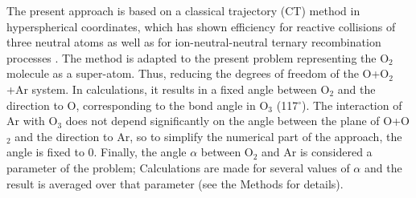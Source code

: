 \documentclass[aps,prl,twocolumn,showpacs,preprintnumbers,amsmath,amssymb,floatfix]{revtex4-2}
\begin{document}
The present approach is based on a classical trajectory (CT) method in hyperspherical coordinates, which has shown efficiency for reactive collisions of three neutral atoms \cite{Perez-Rios2014,Greene2017,Mirahmadi2021,Mirahmadi2021a} as well as for ion-neutral-neutral ternary recombination processes \cite{Perez-Rios2015,Krukow2016,JPR2018}. The method is adapted to the present problem representing the O$_2$ molecule as a super-atom. Thus, reducing the degrees of freedom of the O+O$_2$+Ar system. In calculations, it results in a fixed angle between O$_2$ and the direction to O, corresponding to the bond angle in O$_3$ (117$^\circ$). The interaction of Ar with O$_3$ does not depend significantly on the angle between the plane of O+O$_2$ and the direction to Ar, so to simplify the numerical part of the approach, the angle is fixed to 0. Finally, the angle $\alpha$ between O$_2$ and Ar is considered a parameter of the problem; Calculations are made for several values of $\alpha$ and the result is averaged over that parameter (see the Methods for details). 


\end{document}

